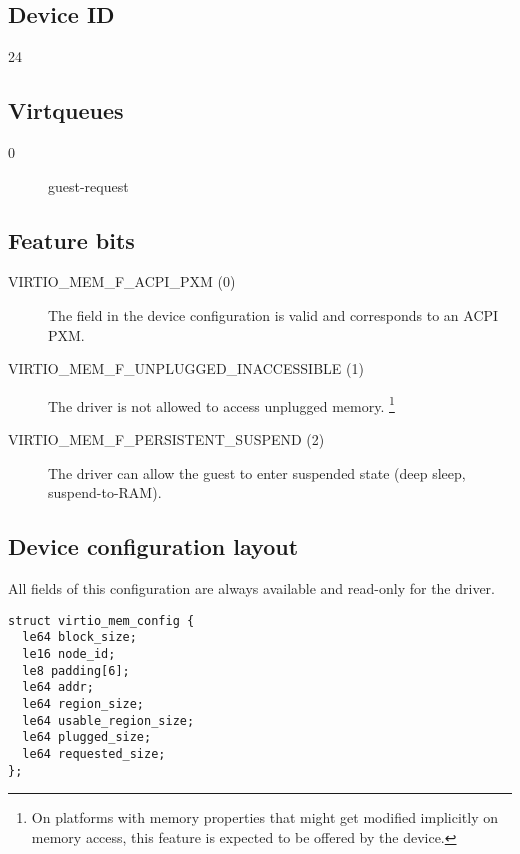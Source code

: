 \subsection{Device ID}\label{sec:Device Types / Memory Device / Device ID}
24

\subsection{Virtqueues}\label{sec:Device Types / Memory Device / Virtqueues}

\begin{description}
\item[0] guest-request
\end{description}

\subsection{Feature bits}\label{sec:Device Types / Memory Device / Feature bits}

\begin{description}
\item[VIRTIO_MEM_F_ACPI_PXM (0)] The field  in the device
configuration is valid and corresponds to an ACPI PXM.
\item[VIRTIO_MEM_F_UNPLUGGED_INACCESSIBLE (1)] The driver is not allowed to
access unplugged memory. \footnote{On platforms with memory properties that
might get modified implicitly on memory access, this feature is expected to
be offered by the device.}
\item[VIRTIO_MEM_F_PERSISTENT_SUSPEND (2)] The driver can allow the guest
to enter suspended state (deep sleep, suspend-to-RAM).
\end{description}

\subsection{Device configuration layout}\label{sec:Device Types / Memory Device / Device configuration layout}

All fields of this configuration are always available and read-only for the
driver.

\begin{lstlisting}
struct virtio_mem_config {
  le64 block_size;
  le16 node_id;
  le8 padding[6];
  le64 addr;
  le64 region_size;
  le64 usable_region_size;
  le64 plugged_size;
  le64 requested_size;
};
\end{lstlisting}

